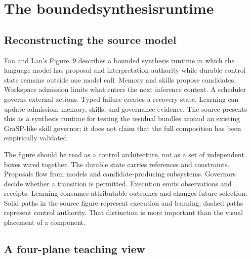 \section{The \gls{boundedsynthesisruntime}}
\label{sec:ch18-bounded-synthesis-runtime}

\subsection{Reconstructing the source model}
\label{subsec:ch18-reconstructing-fig9}

Fan and Lan's Figure~9 describes a bounded synthesis runtime in which the language model has proposal and interpretation authority while durable control state remains outside one model call. Memory and skills propose candidates. Workspace admission limits what enters the next inference context. A scheduler governs external actions. Typed failure creates a recovery state. Learning can update admission, memory, skills, and governance evidence. The source presents this as a synthesis runtime for testing the residual bundles around an existing GraSP-like skill governor; it does not claim that the full composition has been empirically validated.

The figure should be read as a control architecture, not as a set of independent boxes wired together. The durable state carries references and constraints. Proposals flow from models and candidate-producing subsystems. Governors decide whether a transition is permitted. Execution emits observations and receipts. Learning consumes attributable outcomes and changes future selection. Solid paths in the source figure represent execution and learning; dashed paths represent control authority. That distinction is more important than the visual placement of a component.


\subsection{A four-plane teaching view}
\label{subsec:ch18-four-planes}

